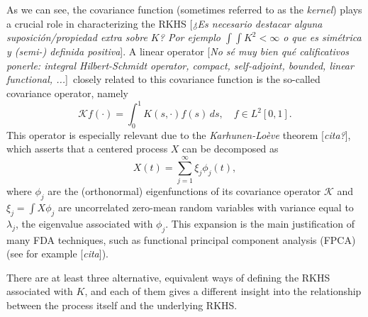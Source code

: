 \documentclass[ba]{imsart}
\numberwithin{equation}{section}
\theoremstyle{plain}
\newcommand\incomment[1]{\color{red}[\textit{#1}]\color{black}}
\begin{document}
As we can see, the covariance function (sometimes referred to as the \textit{kernel}) plays a crucial role in characterizing the RKHS \incomment{¿Es necesario destacar alguna suposición/propiedad extra sobre \(K\)? Por ejemplo \(\int\int K^2 <\infty\) o que es simétrica y (semi-) definida positiva}. A linear operator \incomment{No sé muy bien qué calificativos ponerle: integral Hilbert-Schmidt operator, compact, self-adjoint, bounded, linear functional, ...}\  closely related to this covariance function is the so-called covariance operator, namely
\[
\mathcal Kf(\cdot) = \int_0^1 K(s, \cdot)f(s)\, ds, \quad f \in L^2[0, 1].
\]
This operator is especially relevant due to the \textit{Karhunen-Loève} theorem \incomment{cita?}, which asserts that a centered process \(X\) can be decomposed as
\begin{equation}\label{eq:karhunen-loeve}
X(t) = \sum_{j=1}^\infty \xi_j \phi_j(t),
\end{equation}
where \(\phi_j\) are the (orthonormal) eigenfunctions of its covariance operator \(\mathcal K\) and \(\xi_j = \int X\phi_j\) are uncorrelated zero-mean random variables with variance equal to \(\lambda_j\), the eigenvalue associated with \(\phi_j\). This expansion is the main justification of many FDA techniques, such as functional principal component analysis (FPCA) (see for example \incomment{cita}).

There are at least three alternative, equivalent ways of defining the RKHS associated with \(K\), and each of them gives a different insight into the relationship between the process itself and the underlying RKHS.
\end{document}
